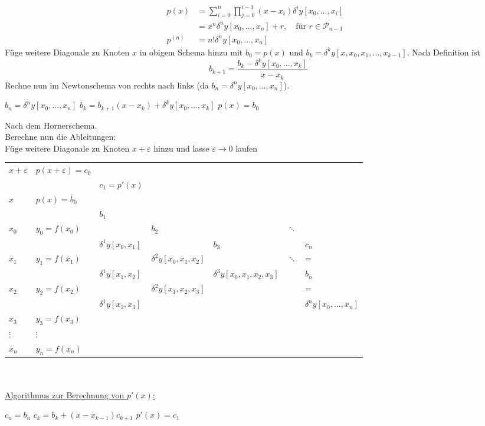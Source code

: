 \documentclass[12pt]{article}
\theoremstyle{break}
\begin{document}
\begin{description}
\begin{align*}
    p(x) &= \sum_{i=0}^n \prod_{j=0}^{i-1} (x-x_i) \delta^iy[x_0,..., x_i] &\\
    &= x^n \delta^ny[x_0,..., x_n] + r, \quad \text{für }r \in \mathcal{P}_{n-1} &\\
    p^{(n)} &= n! \delta^ny[x_0,..., x_n]
  \end{align*}
  Füge weitere Diagonale zu Knoten $x$ in obigem Schema hinzu mit $b_0 = p(x)$ und $b_k = \delta^k y[x, x_0, x_1, ..., x_{k-1}]$. Nach Definition ist 
  $$b_{k+1} = \frac{b_k - \delta^ky[x_0,..., x_k]}{x-x_k}$$
  Rechne nun im Newtonschema von rechts nach links (da $b_n = \delta^ny[x_0,..., x_n]$).
  \begin{algorithmic}
  \STATE $b_n = \delta^ny[x_0,...,x_n]$ 
    \STATE $b_k = b_{k+1} (x-x_k) + \delta^ky[x_0,...,x_k]$
  \ENDFOR
  \STATE $p(x) = b_0$
  \end{algorithmic}
  Nach dem Hornerschema.\\
  Berechne nun die Ableitungen: \\
  Füge weitere Diagonale zu Knoten $x+ \varepsilon$ hinzu und lasse $\varepsilon \rightarrow 0$ laufen \\
  \begin{tabular}{lllllll}
    $x+ \varepsilon$ & $p(x + \varepsilon) = c_0$ \\
    && $c_1 = p'(x)$ \\
    $x$ & $p(x) = b_0$ \\
    &&$b_1$\\
	$x_0$ & $y_0 = f(x_0)$ && $b_2$&&$\ddots$\\
	 & & $\delta^1y[x_0, x_1]$&& $b_3$&&$c_n$\\
	$x_1$ & $y_1 = f(x_1)$ & &$\delta^2y[x_0, x_1, x_2]$  &&$\ddots$ & =\\
	 & & $\delta^1y[x_1, x_2]$ & & $\delta^3y[x_0, x_1, x_2, x_3]$&& $b_n$\\
	$x_2$ & $y_2 = f(x_2)$ & & $\delta^2y[x_1, x_2, x_3]$&&& =\\
	 & & $\delta^1y[x_2, x_3]$&&&& $\delta^ny[x_0,...,x_n]$\\
	$x_3$ & $y_3 = f(x_3)$ \\
	$\vdots$ & $\vdots$\\
	$x_n$ & $y_n = f(x_n)$
  \end{tabular}\\\\
  \underline{Algorithmus zur Berechnung von $p'(x)$:}
  \begin{algorithmic}
  \STATE $c_n = b_n$
  	\STATE $c_k = b_k + (x-x_{k-1})c_{k+1}$
  \ENDFOR
  \STATE $p'(x) = c_1$
  \end{algorithmic}
\end{description}
\end{document}
